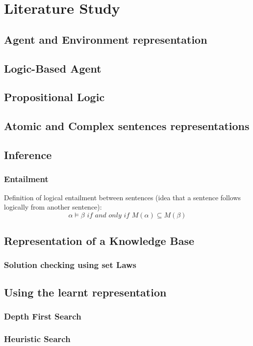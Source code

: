 \chapter{Literature Study} \label{chapter:LStudy}

\section{Agent and Environment representation}

\section{Logic-Based Agent}


\section{Propositional Logic}



\section{Atomic and Complex sentences representations}




\section{Inference}


\subsection{Entailment}
Definition  of logical entailment between sentences (idea that a sentence follows logically from another sentence):
$$\alpha \vDash \beta \textit{ if and only if } M(\alpha) \subseteq M(\beta)$$ 


\section{Representation of a Knowledge Base}
\subsection{Solution checking using set Laws}



\section{Using the learnt representation}
\subsection{Depth First Search}
\subsection{Heuristic Search}



